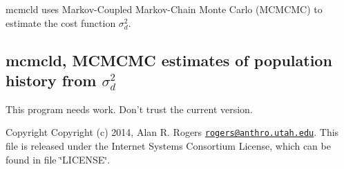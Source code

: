 {\ttfamily mcmcld} uses Markov-\/\+Coupled Markov-\/\+Chain Monte Carlo (M\+C\+M\+C\+M\+C) to estimate the cost function $\sigma_d^2$.

\subsection*{mcmcld, M\+C\+M\+C\+M\+C estimates of population history from $\sigma_d^2$ }

This program needs work. Don't trust the current version.

\begin{DoxyCopyright}{Copyright}
Copyright (c) 2014, Alan R. Rogers \href{mailto:rogers@anthro.utah.edu}{\tt rogers@anthro.\+utah.\+edu}. This file is released under the Internet Systems Consortium License, which can be found in file \char`\"{}\+L\+I\+C\+E\+N\+S\+E\char`\"{}. 
\end{DoxyCopyright}
